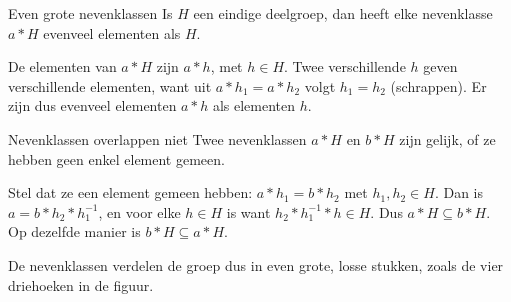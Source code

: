 \begin{theorie}
\begin{stelling}{Even grote nevenklassen}
Is $H$ een eindige deelgroep, dan heeft elke nevenklasse $a \ast H$ evenveel elementen als $H$.
\end{stelling}

\begin{bewijs}
De elementen van $a \ast H$ zijn $a \ast h$, met $h \in H$. Twee verschillende $h$ geven verschillende elementen, want uit $a \ast h_1 = a \ast h_2$ volgt $h_1 = h_2$ (schrappen). Er zijn dus evenveel elementen $a \ast h$ als elementen $h$.
\end{bewijs}
\end{theorie}

\begin{theorie}
\begin{stelling}{Nevenklassen overlappen niet}
Twee nevenklassen $a \ast H$ en $b \ast H$ zijn gelijk, of ze hebben geen enkel element gemeen.
\end{stelling}

\begin{bewijs}
Stel dat ze een element gemeen hebben: $a \ast h_1 = b \ast h_2$ met $h_1, h_2 \in H$. Dan is $a = b \ast h_2 \ast h_1^{-1}$, en voor elke $h \in H$ is
want $h_2 \ast h_1^{-1} \ast h \in H$. Dus $a \ast H \subseteq b \ast H$. Op dezelfde manier is $b \ast H \subseteq a \ast H$.
\end{bewijs}
\end{theorie}

De nevenklassen verdelen de groep dus in even grote, losse stukken, zoals de vier driehoeken in de figuur.


